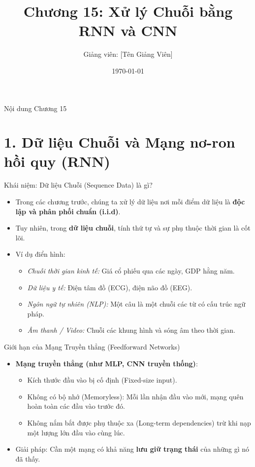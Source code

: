 \documentclass[aspectratio=169]{beamer}
\title[Chương 15: RNN \& CNN cho Chuỗi]{Chương 15: Xử lý Chuỗi bằng RNN và CNN}
\author[Giảng viên]{Giảng viên: [Tên Giảng Viên]}
\institute[Đại Học Đông Á]{Đại Học Đông Á}
\date{\today}
\begin{document}
\begin{frame}
    \titlepage
\end{frame}

\begin{frame}{Nội dung Chương 15}
    \tableofcontents
\end{frame}

\section{1. Dữ liệu Chuỗi và Mạng nơ-ron hồi quy (RNN)}

\begin{frame}{Khái niệm: Dữ liệu Chuỗi (Sequence Data) là gì?}
    \begin{itemize}
        \item Trong các chương trước, chúng ta xử lý dữ liệu nơi mỗi điểm dữ liệu là \textbf{độc lập và phân phối chuẩn (i.i.d)}.
        \item Tuy nhiên, trong \textbf{dữ liệu chuỗi}, tính thứ tự và sự phụ thuộc thời gian là cốt lõi.
        \item Ví dụ điển hình:
        \begin{itemize}
            \item \textit{Chuỗi thời gian kinh tế:} Giá cổ phiếu qua các ngày, GDP hằng năm.
            \item \textit{Dữ liệu y tế:} Điện tâm đồ (ECG), điện não đồ (EEG).
            \item \textit{Ngôn ngữ tự nhiên (NLP):} Một câu là một chuỗi các từ có cấu trúc ngữ pháp.
            \item \textit{Âm thanh / Video:} Chuỗi các khung hình và sóng âm theo thời gian.
        \end{itemize}
    \end{itemize}
\end{frame}

\begin{frame}{Giới hạn của Mạng Truyền thẳng (Feedforward Networks)}
    \begin{itemize}
        \item \textbf{Mạng truyền thẳng (như MLP, CNN truyền thống)}:
        \begin{itemize}
            \item Kích thước đầu vào bị cố định (Fixed-size input).
            \item Không có bộ nhớ (Memoryless): Mỗi lần nhận đầu vào mới, mạng quên hoàn toàn các đầu vào trước đó.
            \item Không nắm bắt được phụ thuộc xa (Long-term dependencies) trừ khi nạp một lượng lớn đầu vào cùng lúc.
        \end{itemize}
        \item Giải pháp: Cần một mạng có khả năng \textbf{lưu giữ trạng thái} của những gì nó đã thấy.
    \end{itemize}
\end{frame}
\end{document}
